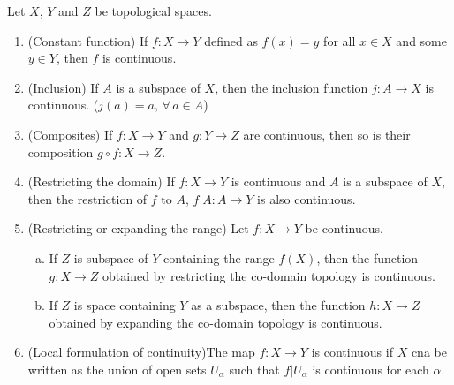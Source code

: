 \documentclass[a4paper,english,12pt]{article}
\begin{document}
\begin{thm} Let $X$, $Y$ and $Z$ be topological spaces.
\begin{enumerate}
\item (Constant function) If $f:X\rightarrow Y$ defined as $f(x)=y$ for all $x\in X$ and some $y\in Y$, then $f$ is continuous.
\item (Inclusion) If $A$ is a subspace of $X$, then the inclusion function $j:A\rightarrow X$ is continuous. ($j(a)=a,\,\forall\,a\in A$)
\item (Composites) If $f:X\rightarrow Y$ and $g:Y\rightarrow Z$ are continuous, then so is their composition $g\circ f:X\rightarrow Z$.
\item (Restricting the domain) If $f:X\rightarrow Y$ is continuous and $A$ is a subspace of $X$, then the restriction of $f$ to $A$, $f|A:A\rightarrow Y$ is also continuous.
\item (Restricting or expanding the range) Let $f:X\rightarrow Y$ be continuous. 
		\begin{enumerate}[a)]
		\item If $Z$ is subspace of $Y$ containing the range $f(X)$, then the function $g:X\rightarrow Z$ obtained by restricting the co-domain topology is continuous.
		\item If $Z$ is space containing $Y$ as a subspace, then the function $h:X\rightarrow Z$ obtained by expanding the co-domain topology is continuous.
		\end{enumerate}
\item (Local formulation of continuity)The map $f:X\rightarrow Y$ is continuous if $X$ cna be written as the union of open sets $U_{\alpha}$ such that $f|U_{\alpha}$ is continuous for each $\alpha$.
\end{enumerate}
\label{rules}
\end{thm}
\end{document}
